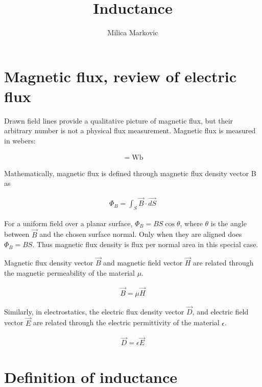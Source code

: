 \documentclass{ximera}
\title{Inductance}
\author{Milica Markovic}
\begin{document}
  
\begin{abstract}  

\end{abstract}  
\maketitle    


\section{Magnetic flux, review of electric flux}

Drawn field lines provide a qualitative picture of magnetic flux, but their arbitrary number is not a physical flux measurement. Magnetic flux is measured in webers:

\begin{eqnarray}
[\Phi_B]=\mathrm{Wb}
\end{eqnarray}

Mathematically, magnetic flux is defined through magnetic flux density vector B as

\begin{eqnarray}
\Phi_B= \int_S \vec{B} \cdot \vec{dS}
\end{eqnarray}

For a uniform field over a planar surface, $\Phi_B=BS\cos\theta$, where $\theta$ is the angle between $\vec{B}$ and the chosen surface normal. Only when they are aligned does $\Phi_B=BS$. Thus magnetic flux density is flux per normal area in this special case.

Magnetic flux density vector $\vec{B}$ and magnetic field vector $\vec{H}$ are related through the magnetic permeability of the material $\mu$.

\begin{eqnarray}
\vec{B} = \mu \vec{H}
\end{eqnarray}

Similarly, in electrostatics, the electric flux density vector $\vec{D}$, and electric field vector $\vec{E}$ are related through the electric permittivity of the material $\epsilon$.

\begin{eqnarray}
\vec{D} = \epsilon \vec{E}
\end{eqnarray}

\section{Definition of inductance}
 
\end{document}
